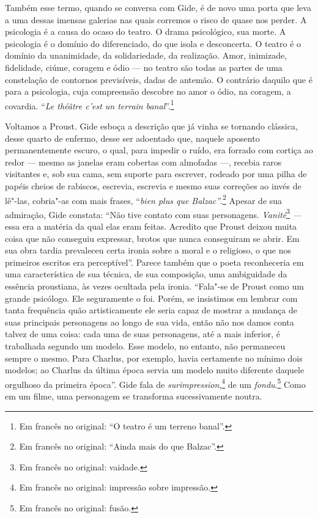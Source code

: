 Também esse termo, quando se conversa com Gide, é de novo uma porta que
leva a uma dessas imensas galerias nas quais corremos o risco de quase nos
perder. A psicologia é a causa do ocaso do teatro. O drama psicológico,
sua morte. A psicologia é o domínio do diferenciado, do que isola e
desconcerta. O teatro é o domínio da unanimidade, da solidariedade, da
realização. Amor, inimizade, fidelidade, ciúme, coragem e ódio --- no
teatro são todas as partes de uma constelação de contornos previsíveis,
dadas de antemão. O contrário daquilo que é para a psicologia, cuja
compreensão descobre no amor o ódio, na coragem, a covardia. ``\emph{Le
théâtre c'est un terrain banal}''.\footnote{Em francês no original: ``O teatro é um terreno banal''. \versal{[N. T.]}}

Voltamos a Proust. Gide esboça a descrição que já vinha se tornando
clássica, desse quarto de enfermo, desse ser adoentado que, naquele aposento
permanentemente escuro, o qual, para impedir o ruído, era forrado
com cortiça ao redor --- mesmo as janelas eram cobertas com almofadas ---,
recebia raros visitantes e, sob sua cama, sem suporte para escrever,
rodeado por uma pilha de papéis cheios de rabiscos, escrevia, escrevia e
mesmo suas correções ao invés de lê"-las, cobria"-as com mais frases,
``\emph{bien plus que Balzac''}.\footnote{Em francês no original: ``Ainda mais do que
  Balzac''. \versal{[N. T.]}} Apesar de sua admiração, Gide constata: ``Não tive
contato com suas personagens. \emph{Vanité}\footnote{Em francês no original: vaidade. \versal{[N. T.]}} \emph{---} essa era a matéria da qual elas eram feitas. Acredito que
Proust deixou muita coisa que não conseguiu expressar, brotos que nunca
conseguiram se abrir. Em sua obra tardia prevaleceu certa ironia sobre a
moral e o religioso, o que nos primeiros escritos era perceptível''.
Parece também que o poeta reconheceria em uma característica de sua
técnica, de sua composição, uma ambiguidade da essência proustiana, às
vezes ocultada pela ironia. ``Fala"-se de Proust como um grande
psicólogo. Ele seguramente o foi. Porém, se insistimos em lembrar com
tanta frequência quão artisticamente ele seria capaz de mostrar a
mudança de suas principais personagens ao longo de sua vida, então não
nos damos conta talvez de uma coisa: cada uma de suas personagens, até a
mais inferior, é trabalhada segundo um modelo. Esse modelo, no entanto,
não permaneceu sempre o mesmo. Para Charlus, por exemplo, havia
certamente no mínimo dois modelos; ao Charlus da última época servia um
modelo muito diferente daquele orgulhoso da primeira época''. Gide fala
de \emph{surimpression},\footnote{Em francês no original: impressão sobre impressão. \versal{[N. T.]}} de um \emph{fondu}.\footnote{Em francês no original: fusão. \versal{[N. T.]}} Como em um filme, uma personagem se transforma sucessivamente
noutra.

